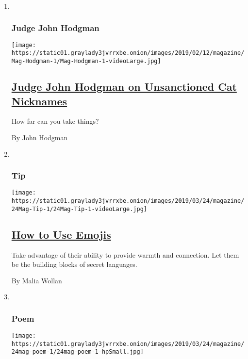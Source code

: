 \begin{enumerate}
\def\labelenumi{\arabic{enumi}.}
\item ~
  \hypertarget{judge-john-hodgman}{%
  \subsubsection{Judge John Hodgman}\label{judge-john-hodgman}}

  \texttt{[image: https://static01.graylady3jvrrxbe.onion/images/2019/02/12/magazine/Mag-Hodgman-1/Mag-Hodgman-1-videoLarge.jpg]}

  \hypertarget{judge-john-hodgman-on-unsanctioned-cat-nicknames}{%
  \subsection{\texorpdfstring{\href{/2019/03/20/magazine/judge-john-hodgman-on-unsanctioned-cat-nicknames.html}{Judge
  John Hodgman on Unsanctioned Cat
  Nicknames}}{Judge John Hodgman on Unsanctioned Cat Nicknames}}\label{judge-john-hodgman-on-unsanctioned-cat-nicknames}}

  How far can you take things?

  By John Hodgman
\item ~
  \hypertarget{tip}{%
  \subsubsection{Tip}\label{tip}}

  \texttt{[image: https://static01.graylady3jvrrxbe.onion/images/2019/03/24/magazine/24Mag-Tip-1/24Mag-Tip-1-videoLarge.jpg]}

  \hypertarget{how-to-use-emojis}{%
  \subsection{\texorpdfstring{\href{/2019/03/19/magazine/how-to-use-emojis.html}{How
  to Use Emojis}}{How to Use Emojis}}\label{how-to-use-emojis}}

  Take advantage of their ability to provide warmth and connection. Let
  them be the building blocks of secret languages.

  By Malia Wollan
\item ~
  \hypertarget{poem}{%
  \subsubsection{Poem}\label{poem}}

  \texttt{[image: https://static01.graylady3jvrrxbe.onion/images/2019/03/24/magazine/24mag-poem-1/24mag-poem-1-hpSmall.jpg]}


\end{enumerate}
